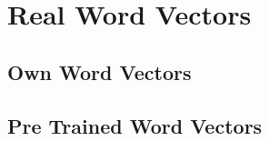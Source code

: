 \chapter{Real Word Vectors}\label{ch:real_wv}

\section{Own Word Vectors}

\section{Pre Trained Word Vectors}